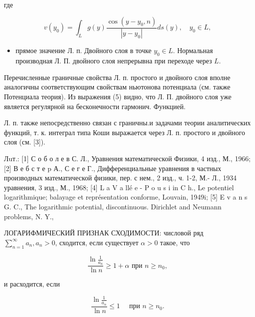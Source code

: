 \documentclass[10pt]{article}
\begin{document}
где



\[

v\left(y_{0}\right)=\int_{L} g(y) \frac{\cos \left(y-y_{0}, n\right)}{\left|y-y_{0}\right|} d s(y), \quad y_{0} \in L,

\]



\begin{itemize}

  \item прямое значение Л. п. Двойного слоя в точке $y_{0} \in L$. Нормальная производная Л. П. двойного слоя непрерывна при переходе через $L$.

\end{itemize}



Перечисленные граничные свойства Л. п. простого и двойного слоя вполне аналогичны соответствующим свойствам ньютонова потенциала (см. также Потенциала теория). Из выражения (5) видно, что Л. П. двойного слоя уже является регулярной на бесконечности гармонич. Функцией.



Л. п. также непосредственно связан с граничны.и задачами теории аналитических функций, т. к. интеграл типа Коши выражается через Л. п. простого и двойного слоя (см. [3]).



Лuт.: [1] С о б о л е в С. Л., Уравнения математической Физики, 4 изд., М., 1966; [2] В е б с т е p А., С е г е Г., Дифференциальные уравнения в частных производных математической физики, пер. с нем., 2 изд., ч. 1-2, М.- Л., 1934 уравнения, 3 изд., М., 1968; [4] L a V a llé e - P o u s i in $\mathrm{C}$ h., Le potentiel logarithmique; balayage et représentation conforme, Louvain, 1949i; [5] E v a n s G. C., The logarithmic potential, discontinuous. Dirichlet and Neumann problems, N. Y.,



ЛОГАРИФМИЧЕСКИЙ ПРИЗНАК СХОДИМОСТИ: числовой ряд $\sum_{n=1}^{\infty} a_{n}, a_{n}>0$, сходится, если существует $\alpha>0$ такое, что



\[

\frac{\ln \frac{1}{a_{n}}}{\ln n} \geqslant 1+\alpha \text { при } n \geqslant n_{0},

\]



и расходится, если



\[

\frac{\ln \frac{1}{a_{n}}}{\ln n} \leqslant 1 \quad \text { при } n \geqslant n_{0} .

\]
\end{document}
